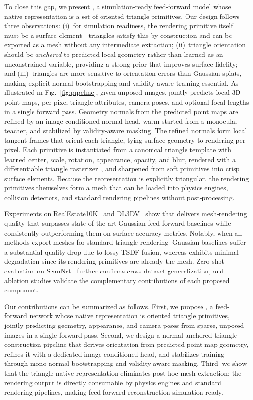 To close this gap, we present \method, a simulation-ready feed-forward model whose native representation is a set of oriented triangle primitives.
Our design follows three observations:
(i)~for simulation readiness, the rendering primitive itself must be a surface element---triangles satisfy this by construction and can be exported as a mesh without any intermediate extraction;
(ii)~triangle orientation should be \emph{anchored} to predicted local geometry rather than learned as an unconstrained variable, providing a strong prior that improves surface fidelity;
and (iii)~triangles are more sensitive to orientation errors than Gaussian splats, making explicit normal bootstrapping and validity-aware training essential.
As illustrated in Fig.~\ref{fig:pipeline}, given unposed images, \method jointly predicts local 3D point maps, per-pixel triangle attributes, camera poses, and optional focal lengths in a single forward pass.
Geometry normals from the predicted point maps are refined by an image-conditioned normal head, warm-started from a monocular teacher, and stabilized by validity-aware masking.
The refined normals form local tangent frames that orient each triangle, tying surface geometry to rendering per pixel.
Each primitive is instantiated from a canonical triangle template with learned center, scale, rotation, appearance, opacity, and blur, rendered with a differentiable triangle rasterizer~\citep{Held2025Triangle}, and sharpened from soft primitives into crisp surface elements.
Because the representation is explicitly triangular, the rendering primitives themselves form a mesh that can be loaded into physics engines, collision detectors, and standard rendering pipelines without post-processing.


Experiments on RealEstate10K~\citep{zhou2018stereo} and DL3DV~\citep{ling2024dl3dv} show that \method delivers mesh-rendering quality that surpasses state-of-the-art Gaussian feed-forward baselines while consistently outperforming them on surface accuracy metrics.
Notably, when all methods export meshes for standard triangle rendering, Gaussian baselines suffer a substantial quality drop due to lossy TSDF fusion, whereas \method exhibits minimal degradation since its rendering primitives are already the mesh.
Zero-shot evaluation on ScanNet~\citep{dai2017scannet} further confirms cross-dataset generalization, and ablation studies validate the complementary contributions of each proposed component.

Our contributions can be summarized as follows.
First, we propose \method, a feed-forward network whose native representation is oriented triangle primitives, jointly predicting geometry, appearance, and camera poses from sparse, unposed images in a single forward pass.
Second, we design a normal-anchored triangle construction pipeline that derives orientation from predicted point-map geometry, refines it with a dedicated image-conditioned head, and stabilizes training through mono-normal bootstrapping and validity-aware masking.
Third, we show that the triangle-native representation eliminates post-hoc mesh extraction: the rendering output is directly consumable by physics engines and standard rendering pipelines, making feed-forward reconstruction simulation-ready.
